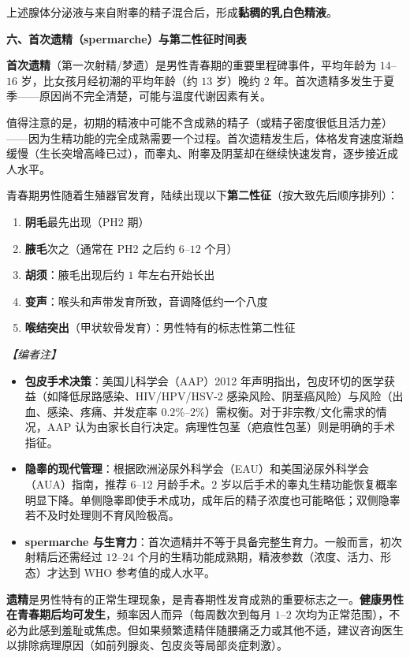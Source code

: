 \begin{enumerate}
上述腺体分泌液与来自附睾的精子混合后，形成\textbf{黏稠的乳白色精液}。

\vspace{0.3em}
\noindent\textbf{六、首次遗精（spermarche）与第二性征时间表}

\textbf{首次遗精}（第一次射精/梦遗）是男性青春期的重要里程碑事件，平均年龄为 $14$--$16$ 岁，比女孩月经初潮的平均年龄（约 $13$ 岁）晚约 $2$ 年。首次遗精多发生于夏季——原因尚不完全清楚，可能与温度代谢因素有关。

值得注意的是，初期的精液中可能不含成熟的精子（或精子密度很低且活力差）——因为生精功能的完全成熟需要一个过程。首次遗精发生后，体格发育速度渐趋缓慢（生长突增高峰已过），而睾丸、附睾及阴茎却在继续快速发育，逐步接近成人水平。

青春期男性随着生殖器官发育，陆续出现以下\textbf{第二性征}（按大致先后顺序排列）：
\begin{enumerate}
	\item \textbf{阴毛}最先出现（PH2 期）
	\item \textbf{腋毛}次之（通常在 PH2 之后约 $6$--$12$ 个月）
	\item \textbf{胡须}：腋毛出现后约 $1$ 年左右开始长出
	\item \textbf{变声}：喉头和声带发育所致，音调降低约一个八度
	\item \textbf{喉结突出}（甲状软骨发育）：男性特有的标志性第二性征
\end{enumerate}

\vspace{0.5em}
\noindent\textit{【编者注】}
\begin{itemize}
	\item \textbf{包皮手术决策}：美国儿科学会（AAP）2012 年声明指出，包皮环切的医学获益（如降低尿路感染、HIV/HPV/HSV-2 感染风险、阴茎癌风险）与风险（出血、感染、疼痛、并发症率 $0.2\%$--$2\%$）需权衡。对于非宗教/文化需求的情况，AAP 认为由家长自行决定。病理性包茎（疤痕性包茎）则是明确的手术指征。
	\item \textbf{隐睾的现代管理}：根据欧洲泌尿外科学会（EAU）和美国泌尿外科学会（AUA）指南，推荐 $6$--$12$ 月龄手术。$2$ 岁以后手术的睾丸生精功能恢复概率明显下降。单侧隐睾即使手术成功，成年后的精子浓度也可能略低；双侧隐睾若不及时处理则不育风险极高。
	\item \textbf{spermarche 与生育力}：首次遗精并不等于具备完整生育力。一般而言，初次射精后还需经过 $12$--$24$ 个月的生精功能成熟期，精液参数（浓度、活力、形态）才达到 WHO 参考值的成人水平。
\end{itemize}

\begin{tcolorbox}[colback=pink!5!white,colframe=red!50!black,title=贴心小叮咛]
\textbf{遗精}是男性特有的正常生理现象，是青春期性发育成熟的重要标志之一。\textbf{健康男性在青春期后均可发生}，频率因人而异（每周数次到每月 $1$--$2$ 次均为正常范围），不必为此感到羞耻或焦虑。但如果频繁遗精伴随腰痛乏力或其他不适，建议咨询医生以排除病理原因（如前列腺炎、包皮炎等局部炎症刺激）。
\end{tcolorbox}


\end{enumerate}
